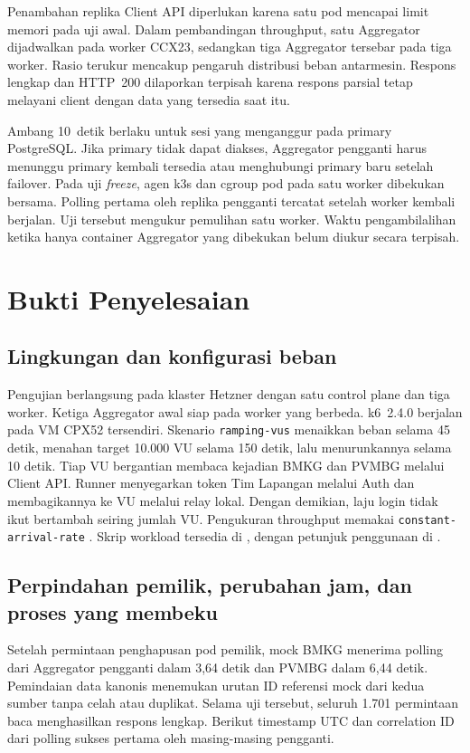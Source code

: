 Penambahan replika Client API diperlukan karena satu pod mencapai limit memori pada uji awal. Dalam pembandingan throughput, satu Aggregator dijadwalkan pada worker CCX23, sedangkan tiga Aggregator tersebar pada tiga worker. Rasio terukur mencakup pengaruh distribusi beban antarmesin. Respons lengkap dan HTTP~200 dilaporkan terpisah karena respons parsial tetap melayani client dengan data yang tersedia saat itu.

Ambang 10~detik berlaku untuk sesi yang menganggur pada primary PostgreSQL. Jika primary tidak dapat diakses, Aggregator pengganti harus menunggu primary kembali tersedia atau menghubungi primary baru setelah failover. Pada uji \textit{freeze}, agen k3s dan cgroup pod pada satu worker dibekukan bersama. Polling pertama oleh replika pengganti tercatat setelah worker kembali berjalan. Uji tersebut mengukur pemulihan satu worker. Waktu pengambilalihan ketika hanya container Aggregator yang dibekukan belum diukur secara terpisah.

\section{Bukti Penyelesaian}

\subsection{Lingkungan dan konfigurasi beban}

Pengujian berlangsung pada klaster Hetzner dengan satu control plane dan tiga worker. Ketiga Aggregator awal siap pada worker yang berbeda. k6~2.4.0 berjalan pada VM CPX52 tersendiri. Skenario \texttt{ramping-vus} menaikkan beban selama 45 detik, menahan target 10.000 VU selama 150 detik, lalu menurunkannya selama 10 detik. Tiap VU bergantian membaca kejadian BMKG dan PVMBG melalui Client API. Runner menyegarkan token Tim Lapangan melalui Auth dan membagikannya ke VU melalui relay lokal. Dengan demikian, laju login tidak ikut bertambah seiring jumlah VU. Pengukuran throughput memakai \texttt{constant-arrival-rate} \cite{k6}. Skrip workload tersedia di , dengan petunjuk penggunaan di .

\subsection{Perpindahan pemilik, perubahan jam, dan proses yang membeku}

Setelah permintaan penghapusan pod pemilik, mock BMKG menerima polling dari Aggregator pengganti dalam 3{,}64 detik dan PVMBG dalam 6{,}44 detik. Pemindaian data kanonis menemukan urutan ID referensi mock dari kedua sumber tanpa celah atau duplikat. Selama uji tersebut, seluruh 1.701 permintaan baca menghasilkan respons lengkap. Berikut timestamp UTC dan correlation ID dari polling sukses pertama oleh masing-masing pengganti.

